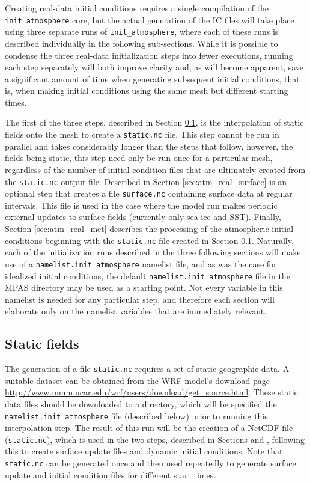 Creating real-data initial conditions requires a single compilation of the {\tt init\_atmosphere} core, but the actual generation of the IC files will take place using three separate runs of {\tt init\_atmosphere}, where each of these runs is described individually in the following sub-sections.  While it is possible to condense the three real-data initialization steps into fewer executions, running each step separately will both improve clarity and, as will become apparent, save a significant amount of time when generating subsequent initial conditions, that is, when making initial conditions using the same mesh but different starting times.

The first of the three steps, described in Section \ref{sec:atm_real_static}, is the interpolation of static fields onto the mesh to create a {\tt static.nc} file.  This step cannot be run in parallel and takes considerably longer than the steps that follow, however, the fields being static, this step need only be run once for a particular mesh, regardless of the number of initial condition files that are ultimately created from the {\tt static.nc} output file.  Described in Section \ref{sec:atm_real_surface} is an optional step that creates a file {\tt surface.nc} containing surface data at regular intervals. This file is used in the case where the model run makes periodic external updates to surface fields (currently only sea-ice and SST).  Finally, Section \ref{sec:atm_real_met} describes the processing of the atmospheric initial conditions beginning with the {\tt static.nc} file created in Section \ref{sec:atm_real_static}.  Naturally, each of the initialization runs described in the three following sections will make use of a {\tt namelist.init\_atmosphere} namelist file, and as was the case for idealized initial conditions, the default {\tt namelist.init\_atmosphere} file in the MPAS directory may be used as a starting point.  Not every variable in this namelist is needed for any particular step, and therefore each section will elaborate only on the namelist variables that are immediately relevant.

\subsection{Static fields}
\label{sec:atm_real_static}

The generation of a file {\tt static.nc} requires a set of static geographic data.  A suitable dataset can be obtained from the WRF model's download page \\
 \url{http://www.mmm.ucar.edu/wrf/users/download/get\_source.html}.  These static data files should be downloaded to a directory, which will be specified the {\tt namelist.init\_atmosphere} file (described below) prior to running this interpolation step.  The result of this run will be the creation of a NetCDF file ({\tt static.nc}), which is used in the two steps, described in Sections \label{sec:atm_real_surface} and \label{sec:atm_real_met}, following this to create surface update files and dynamic initial conditions.  Note that {\tt static.nc} can be generated once and then used repeatedly to generate surface update and initial condition files for different start times.

